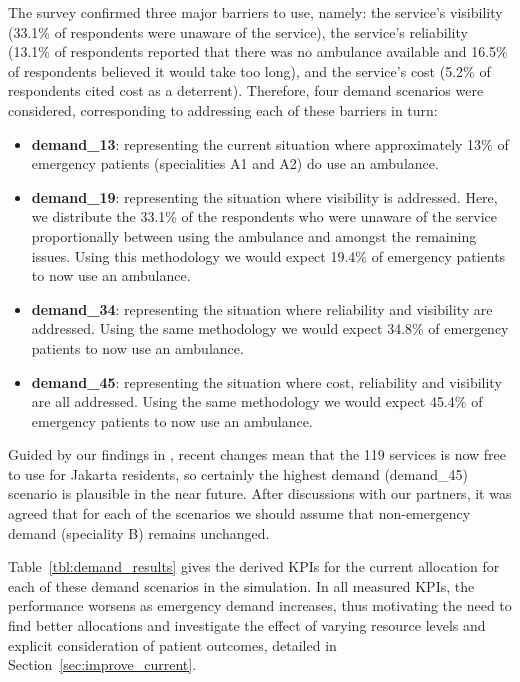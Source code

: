 \documentclass[preprint,12pt]{elsarticle}
\begin{document}
The survey confirmed three major barriers to use, namely: the service's
visibility (33.1\% of respondents were unaware of the service), the service's
reliability (13.1\% of respondents reported that there was no ambulance
available and 16.5\% of respondents believed it would take too long), and the
service's cost (5.2\% of respondents cited cost as a deterrent). Therefore,
four demand scenarios were considered, corresponding to addressing each of
these barriers in turn:

\begin{itemize}
  \item \textbf{demand\_13}: representing the current situation where
        approximately 13\% of emergency patients (specialities A1 and A2) do
        use an ambulance.
  \item \textbf{demand\_19}: representing the situation where visibility is
        addressed. Here, we distribute the 33.1\% of the respondents who were
        unaware of the service proportionally between using the ambulance and
        amongst the remaining issues. Using this methodology we would expect
        19.4\% of emergency patients to now use an ambulance.  
  \item \textbf{demand\_34}: representing the situation where reliability and
        visibility are addressed. Using the same methodology we would expect
        34.8\% of emergency patients to now use an ambulance.
  \item \textbf{demand\_45}: representing the situation where cost,
        reliability and visibility are all addressed. Using the same
        methodology we would expect 45.4\% of emergency patients to now use an
        ambulance. 
\end{itemize}

Guided by our findings in \cite{BriceSyaribahNoor2022Esui}, recent changes
mean that the 119 services is now free to use for Jakarta residents, so
certainly the highest demand (demand\_45) scenario is plausible in the near
future. After discussions with our partners, it was agreed that for each of
the scenarios we should assume that non-emergency demand (speciality B)
remains unchanged.  

Table~\ref{tbl:demand_results} gives the derived KPIs for the current
allocation for each of these demand scenarios in the simulation. In all
measured KPIs, the performance worsens as emergency demand increases, thus
motivating the need to find better allocations and investigate the effect of
varying resource levels and explicit consideration of patient outcomes,
detailed in Section~\ref{sec:improve_current}.
\end{document}
